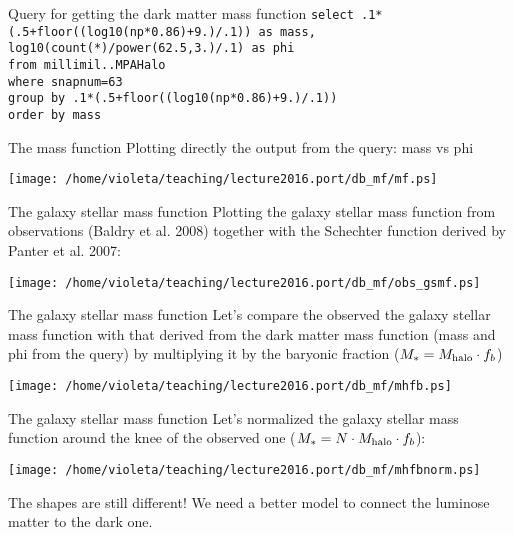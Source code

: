 \documentclass{beamer}
\begin{document}
\begin{frame}{Query for getting the dark matter mass function}
\texttt{select .1*(.5+floor((log10(np*0.86)+9.)/.1)) as mass, \\
       log10(count(*)/power(62.5,3.)/.1) as phi \\
from millimil..MPAHalo \\
where snapnum=63 \\
group by .1*(.5+floor((log10(np*0.86)+9.)/.1)) \\
order by mass   
}
\end{frame}

\begin{frame}{The mass function}
Plotting directly the output from the query: mass vs phi
\begin{center}
\texttt{[image: /home/violeta/teaching/lecture2016.port/db\_mf/mf.ps]}
\end{center}
\end{frame}


\begin{frame}{The galaxy stellar mass function}
Plotting the galaxy stellar mass function from observations (Baldry et al. 2008) together with the Schechter function derived by Panter et al. 2007:
\begin{center}
\texttt{[image: /home/violeta/teaching/lecture2016.port/db\_mf/obs\_gsmf.ps]}
\end{center}
\end{frame}


\begin{frame}{The galaxy stellar mass function }
Let's compare the observed the galaxy stellar mass function with that derived from the dark matter mass function (mass and phi from the query) by multiplying it by the baryonic fraction ($M_{*}=M_{\rm halo}\cdot f_b$)
\begin{center}
\texttt{[image: /home/violeta/teaching/lecture2016.port/db\_mf/mhfb.ps]}
\end{center}
\end{frame}


\begin{frame}{The galaxy stellar mass function }
Let's normalized the galaxy stellar mass function around the knee of the observed one ($M_{*}=N\cdot M_{\rm halo}\cdot f_b$):
\begin{center}
\texttt{[image: /home/violeta/teaching/lecture2016.port/db\_mf/mhfbnorm.ps]}
\end{center}
The shapes are still different! We need a better model to connect the luminose matter to the dark one.
\end{frame}
\end{document}
